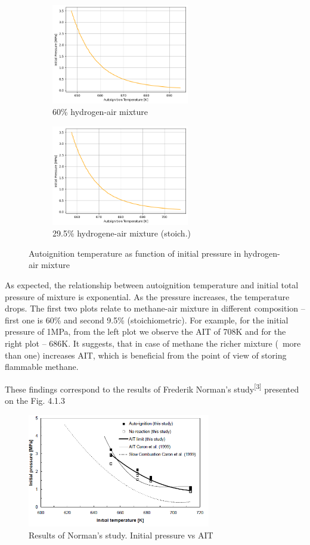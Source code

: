\documentclass[a4paper,11pt]{article}
\begin{document}
\begin{figure}[h]
\begin{subfigure}{.5\textwidth}
\centering
\includegraphics[width=6cm]{1wodor60.png}
\caption{60\% hydrogen-air mixture}
\end{subfigure}
\begin{subfigure}{.5\textwidth}
\centering
\includegraphics[width=6cm]{1wodor29.5.png}
\caption{29.5\% hydrogene-air mixture (stoich.)}
\end{subfigure}
\caption{Autoignition temperature as function of initial pressure in hydrogen-air mixture}
\end{figure}

	As expected, the relationship between autoignition temperature and initial total pressure of mixture is exponential. As the pressure increases, the temperature drops. The first two plots relate to methane-air mixture in different composition – first one is 60\% and second 9.5\% (stoichiometric). For example, for the initial pressure of 1MPa, from the left plot we observe the AIT of 708K and for the right plot – 686K. It suggests, that in case of methane the richer mixture (\textPhi \ more than one) increases AIT, which is beneficial from the point of view of storing flammable methane.\par
	These findings correspond to the results of Frederik Norman's study\textsuperscript{[3]} presented on the Fig. 4.1.3 

\begin{figure}[h]
\centering
\includegraphics[width=8cm]{norman.PNG}
\caption{Results of Norman's study. Initial pressure vs AIT}
\end{figure}
\end{document}
